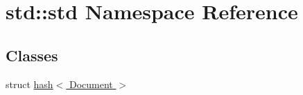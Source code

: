 \hypertarget{namespacestd_1_1std}{}\section{std\+:\+:std Namespace Reference}
\label{namespacestd_1_1std}
\subsection*{Classes}
\begin{DoxyCompactItemize}
\item 
struct \hyperlink{structstd_1_1std_1_1hash_3_01_document_01_4}{hash$<$ Document $>$}
\end{DoxyCompactItemize}
